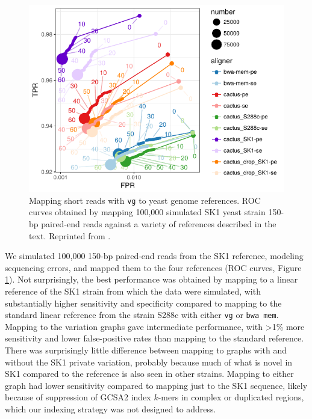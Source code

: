 \documentclass[a4paper,12pt,numbered,oneside]{Classes/PhDThesisPSnPDF}
\providecommand{\DIFaddbeginFL}{} %
\providecommand{\DIFaddendFL}{} %
\begin{document}
\begin{figure}[htbp!]
  \centering
  \includegraphics[width=1.0\textwidth]{Chapter3/Figs/e68fc338_test_sim_yeast_cactus-roc.pdf}
  \caption[Cactus yeast simulation]{Mapping short reads with \DIFaddbeginFL {\tt \DIFaddendFL vg\DIFaddbeginFL } \DIFaddendFL to yeast genome references.
    ROC curves obtained by mapping 100,000 simulated SK1 yeast strain 150-bp paired-end reads against a variety of references described in the text.
    Reprinted from \cite{garrison2018variation}.}
  \label{fig:cactus_yeast_sim}
\end{figure}


We simulated 100,000 150-bp paired-end reads from the SK1 reference, modeling sequencing errors, and mapped them to the four references (ROC curves, Figure \ref{fig:cactus_yeast_sim}).
Not surprisingly, the best performance was obtained by mapping to a linear reference of the SK1 strain from which the data were simulated, with substantially higher sensitivity and specificity compared to mapping to the standard linear reference from the strain S288c with either {\tt vg} or {\tt bwa mem}.
Mapping to the variation graphs gave intermediate performance, with >1\% more sensitivity and lower false-positive rates than mapping to the standard reference.
There was surprisingly little difference between mapping to graphs with and without the SK1 private variation, probably because much of what is novel in SK1 compared to the reference is also seen in other strains.
Mapping to either graph had lower sensitivity compared to mapping just to the SK1 sequence, likely because of suppression of GCSA2 index $k$-mers in complex or duplicated regions, which our indexing strategy was not designed to address.
\end{document}
